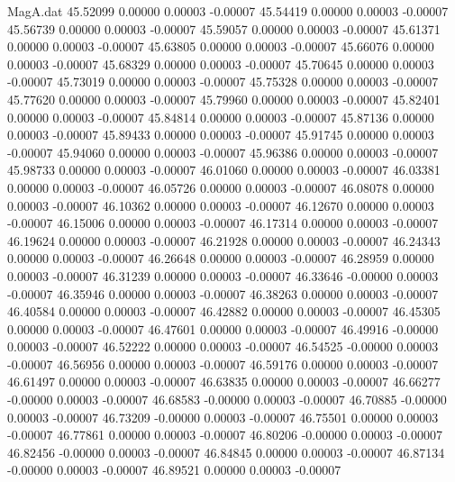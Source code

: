 \begin{filecontents}{MagA.dat}
  45.52099    0.00000    0.00003   -0.00007
  45.54419    0.00000    0.00003   -0.00007
  45.56739    0.00000    0.00003   -0.00007
  45.59057    0.00000    0.00003   -0.00007
  45.61371    0.00000    0.00003   -0.00007
  45.63805    0.00000    0.00003   -0.00007
  45.66076    0.00000    0.00003   -0.00007
  45.68329    0.00000    0.00003   -0.00007
  45.70645    0.00000    0.00003   -0.00007
  45.73019    0.00000    0.00003   -0.00007
  45.75328    0.00000    0.00003   -0.00007
  45.77620    0.00000    0.00003   -0.00007
  45.79960    0.00000    0.00003   -0.00007
  45.82401    0.00000    0.00003   -0.00007
  45.84814    0.00000    0.00003   -0.00007
  45.87136    0.00000    0.00003   -0.00007
  45.89433    0.00000    0.00003   -0.00007
  45.91745    0.00000    0.00003   -0.00007
  45.94060    0.00000    0.00003   -0.00007
  45.96386    0.00000    0.00003   -0.00007
  45.98733    0.00000    0.00003   -0.00007
  46.01060    0.00000    0.00003   -0.00007
  46.03381    0.00000    0.00003   -0.00007
  46.05726    0.00000    0.00003   -0.00007
  46.08078    0.00000    0.00003   -0.00007
  46.10362    0.00000    0.00003   -0.00007
  46.12670    0.00000    0.00003   -0.00007
  46.15006    0.00000    0.00003   -0.00007
  46.17314    0.00000    0.00003   -0.00007
  46.19624    0.00000    0.00003   -0.00007
  46.21928    0.00000    0.00003   -0.00007
  46.24343    0.00000    0.00003   -0.00007
  46.26648    0.00000    0.00003   -0.00007
  46.28959    0.00000    0.00003   -0.00007
  46.31239    0.00000    0.00003   -0.00007
  46.33646   -0.00000    0.00003   -0.00007
  46.35946    0.00000    0.00003   -0.00007
  46.38263    0.00000    0.00003   -0.00007
  46.40584    0.00000    0.00003   -0.00007
  46.42882    0.00000    0.00003   -0.00007
  46.45305    0.00000    0.00003   -0.00007
  46.47601    0.00000    0.00003   -0.00007
  46.49916   -0.00000    0.00003   -0.00007
  46.52222    0.00000    0.00003   -0.00007
  46.54525   -0.00000    0.00003   -0.00007
  46.56956    0.00000    0.00003   -0.00007
  46.59176    0.00000    0.00003   -0.00007
  46.61497    0.00000    0.00003   -0.00007
  46.63835    0.00000    0.00003   -0.00007
  46.66277   -0.00000    0.00003   -0.00007
  46.68583   -0.00000    0.00003   -0.00007
  46.70885   -0.00000    0.00003   -0.00007
  46.73209   -0.00000    0.00003   -0.00007
  46.75501    0.00000    0.00003   -0.00007
  46.77861    0.00000    0.00003   -0.00007
  46.80206   -0.00000    0.00003   -0.00007
  46.82456   -0.00000    0.00003   -0.00007
  46.84845    0.00000    0.00003   -0.00007
  46.87134   -0.00000    0.00003   -0.00007
  46.89521    0.00000    0.00003   -0.00007

\end{filecontents}
